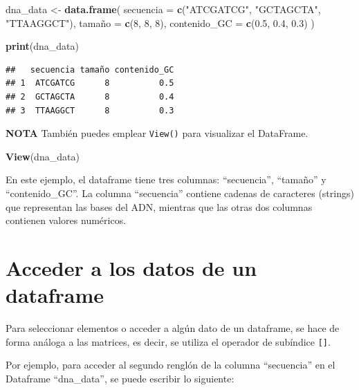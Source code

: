 \documentclass[
]{book}
\newenvironment{Shaded}{\begin{snugshade}}{\end{snugshade}}
\newcommand{\AttributeTok}[1]{\textcolor[rgb]{0.13,0.29,0.53}{#1}}
\newcommand{\DecValTok}[1]{\textcolor[rgb]{0.00,0.00,0.81}{#1}}
\newcommand{\FloatTok}[1]{\textcolor[rgb]{0.00,0.00,0.81}{#1}}
\newcommand{\FunctionTok}[1]{\textcolor[rgb]{0.13,0.29,0.53}{\textbf{#1}}}
\newcommand{\NormalTok}[1]{#1}
\newcommand{\OtherTok}[1]{\textcolor[rgb]{0.56,0.35,0.01}{#1}}
\newcommand{\StringTok}[1]{\textcolor[rgb]{0.31,0.60,0.02}{#1}}
\begin{document}
\begin{Shaded}
\begin{Highlighting}[]
\NormalTok{dna\_data }\OtherTok{\textless{}{-}} \FunctionTok{data.frame}\NormalTok{(}
  \AttributeTok{secuencia =} \FunctionTok{c}\NormalTok{(}\StringTok{"ATCGATCG"}\NormalTok{, }\StringTok{"GCTAGCTA"}\NormalTok{, }\StringTok{"TTAAGGCT"}\NormalTok{),}
\NormalTok{  tamaño }\OtherTok{=} \FunctionTok{c}\NormalTok{(}\DecValTok{8}\NormalTok{, }\DecValTok{8}\NormalTok{, }\DecValTok{8}\NormalTok{),}
  \AttributeTok{contenido\_GC =} \FunctionTok{c}\NormalTok{(}\FloatTok{0.5}\NormalTok{, }\FloatTok{0.4}\NormalTok{, }\FloatTok{0.3}\NormalTok{)}
\NormalTok{)}

\FunctionTok{print}\NormalTok{(dna\_data)}
\end{Highlighting}
\end{Shaded}

\begin{verbatim}
##   secuencia tamaño contenido_GC
## 1  ATCGATCG      8          0.5
## 2  GCTAGCTA      8          0.4
## 3  TTAAGGCT      8          0.3
\end{verbatim}

\textbf{NOTA} También puedes emplear \texttt{View()} para visualizar el DataFrame.

\begin{Shaded}
\begin{Highlighting}[]
\FunctionTok{View}\NormalTok{(dna\_data)}
\end{Highlighting}
\end{Shaded}

En este ejemplo, el dataframe tiene tres columnas: ``secuencia'', ``tamaño'' y ``contenido\_GC''. La columna ``secuencia'' contiene cadenas de caracteres (strings) que representan las bases del ADN, mientras que las otras dos columnas contienen valores numéricos.

\section{Acceder a los datos de un dataframe}\label{acceder-a-los-datos-de-un-dataframe}

Para seleccionar elementos o acceder a algún dato de un dataframe, se hace de forma análoga a las matrices, es decir, se utiliza el operador de subíndice \texttt{{[}{]}}.

Por ejemplo, para acceder al segundo renglón de la columna ``secuencia'' en el Dataframe ``dna\_data'', se puede escribir lo siguiente:
\end{document}
